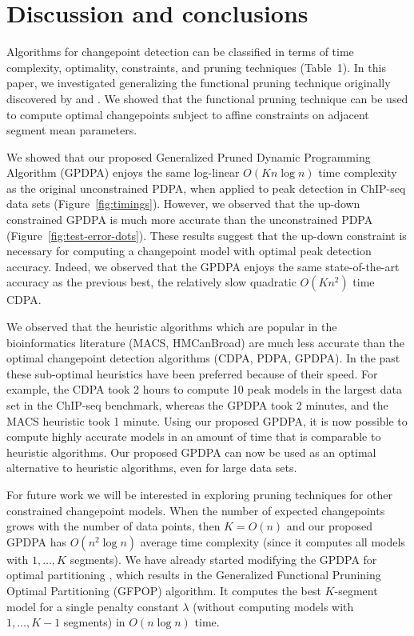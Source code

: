 \documentclass[aoas]{imsart}
\begin{document}
\section{Discussion and conclusions}
\label{sec:discussion}

Algorithms for changepoint detection can be classified in terms of
time complexity, optimality, constraints, and pruning techniques
(Table~1). In this paper, we investigated generalizing the functional
pruning technique originally discovered by \citet{pruned-dp} and
\citet{phd-johnson}. We showed that the functional pruning technique can
be used to compute optimal changepoints subject to affine constraints
on adjacent segment mean parameters.

We showed that our proposed Generalized Pruned Dynamic Programming
Algorithm (GPDPA) enjoys the same log-linear $O(Kn\log n)$ time
complexity as the original unconstrained PDPA, when applied to peak
detection in ChIP-seq data sets (Figure~\ref{fig:timings}). However,
we observed that the up-down constrained GPDPA is much more accurate
than the unconstrained PDPA (Figure~\ref{fig:test-error-dots}). These
results suggest that the up-down constraint is necessary for computing
a changepoint model with optimal peak detection accuracy. Indeed, we
observed that the GPDPA enjoys the same state-of-the-art accuracy as
the previous best, the relatively slow quadratic $O(Kn^2)$ time
CDPA.


We observed that the heuristic algorithms which are popular in the
bioinformatics literature (MACS, HMCanBroad) are much less accurate
than the optimal changepoint detection algorithms (CDPA, PDPA,
GPDPA). In the past these sub-optimal heuristics have been preferred
because of their speed. For example, the CDPA took 2 hours to compute
10 peak models in the largest data set in the ChIP-seq benchmark,
whereas the GPDPA took 2 minutes, and the MACS heuristic took 1
minute. Using our proposed GPDPA, it is now possible to compute highly
accurate models in an amount of time that is comparable to heuristic
algorithms. Our proposed GPDPA can now be used as an optimal
alternative to heuristic algorithms, even for large data sets.

For future work we will be interested in exploring pruning techniques
for other constrained changepoint models. When the number of expected
changepoints grows with the number of data points, then $K=O(n)$ and
our proposed GPDPA has $O(n^2 \log n)$ average time complexity (since
it computes all models with $1,\dots,K$ segments). We have already
started modifying the GPDPA for optimal partitioning
\citep{optimal-partitioning}, which results in the Generalized
Functional Prunining Optimal Partitioning (GFPOP) algorithm. It
computes the best $K$-segment model for a single penalty constant $\lambda$
(without computing models with $1,\dots,K-1$ segments) in $O(n\log n)$
time.
\end{document}
